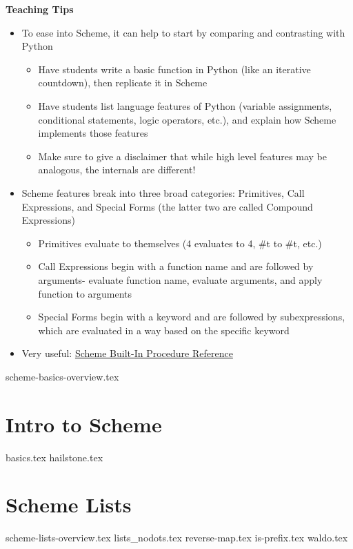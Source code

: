 \documentclass{exam}
\begin{document}
\begin{blocksection}
\begin{guide}
\textbf{Teaching Tips}
\begin{itemize}
  \item To ease into Scheme, it can help to start by comparing and contrasting with Python
  \begin{itemize}
    \item Have students write a basic function in Python (like an iterative countdown), then replicate it in Scheme
    \item Have students list language features of Python (variable assignments, conditional statements, logic operators, etc.), and explain how Scheme implements those features
    \item Make sure to give a disclaimer that while high level features may be analogous, the internals are different!
  \end{itemize}
  \item Scheme features break into three broad categories: Primitives, Call Expressions, and Special Forms (the latter two are called Compound Expressions)
  \begin{itemize}
    \item Primitives evaluate to themselves (4 evaluates to 4, \#t to \#t, etc.)
    \item Call Expressions begin with a function name and are followed by arguments- evaluate function name, evaluate arguments, and apply function to arguments
    \item Special Forms begin with a keyword and are followed by subexpressions, which are evaluated in a way based on the specific keyword
  \end{itemize}
  \item Very useful: \href{https://cs61a.org/articles/scheme-builtins.html}{Scheme Built-In Procedure Reference}
\end{itemize}
\end{guide}
\end{blocksection}

{scheme-basics-overview.tex}
\newpage
\section{Intro to Scheme}
\begin{questions}
{basics.tex}
{hailstone.tex}

\section{Scheme Lists}
{scheme-lists-overview.tex}
\newpage
{lists_nodots.tex}
\newpage
{reverse-map.tex}
{is-prefix.tex}
{waldo.tex}
\end{questions}
\end{document}
